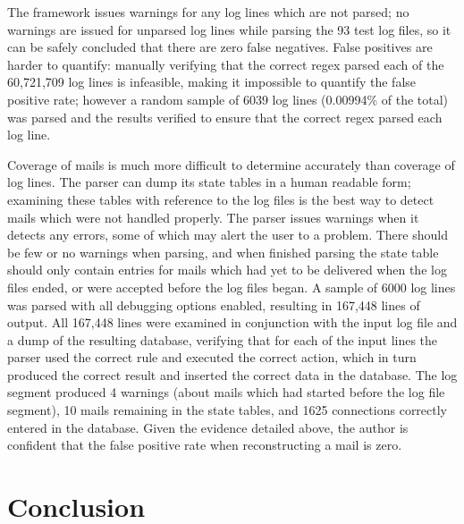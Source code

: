 \documentclass[draft]{svmult}
\newcommand{\numberOFlogFILES}[0]{%
    93%
}
\begin{document}
The framework issues warnings for any log lines which are not parsed; no
warnings are issued for unparsed log lines while parsing the
\numberOFlogFILES{} test log files, so it can be safely concluded that
there are zero false negatives.  False positives are harder to quantify:
manually verifying that the correct regex parsed each of the 60,721,709 log
lines is infeasible, making it impossible to quantify the false positive
rate; however a random sample of 6039 log lines (0.00994\% of the total)
was parsed and the results verified to ensure that the correct regex parsed
each log line.

Coverage of mails is much more difficult to determine accurately than
coverage of log lines.  The parser can dump its state tables in a human
readable form; examining these tables with reference to the log files is
the best way to detect mails which were not handled properly.  The parser
issues warnings when it detects any errors, some of which may alert the
user to a problem.  There should be few or no warnings when parsing, and
when finished parsing the state table should only contain entries for mails
which had yet to be delivered when the log files ended, or were accepted
before the log files began.  A sample of 6000 log lines was parsed with all
debugging options enabled, resulting in 167,448 lines of output.  All
167,448 lines were examined in conjunction with the input log file and a
dump of the resulting database, verifying that for each of the input lines
the parser used the correct rule and executed the correct action, which in
turn produced the correct result and inserted the correct data in the
database.  The log segment produced 4 warnings (about mails which had
started before the log file segment), 10 mails remaining in the state
tables, and 1625 connections correctly entered in the database.  Given the
evidence detailed above, the author is confident that the false positive
rate when reconstructing a mail is zero.


\section{Conclusion}
\end{document}
